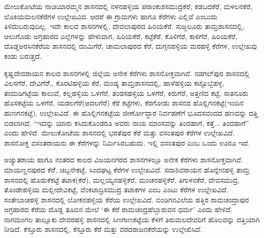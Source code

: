ಮೇಲುಕೋಟೆಯ ನಾಚಿಯಾರಮ್ಮನ ಶಾಸನದಲ್ಲಿ ನಳನಹಳ್ಳಿಯ ಪರಾಂಕುಶಸಮುದ್ರಕೆರೆ, ಕಡಬದಕೆರೆ, ಮಳಲನಕೆರೆ, ಲೊಕಿಯಮಲನಕೆರೆಗಳ ಉಲ್ಲೇಖವಿದ. ಆದರೆ ಈ ಗ್ರಾಮಗಳು ಹಾಗೂ ಕೆರೆಗಳು ಎಲ್ಲಿವೆ ಎಂಬುದು ತಿಳಿದುಬರುವುದಿಲ್ಲ. ಇದೇ ಕಾಲದ ಶಾಸನಗಳಲ್ಲಿ, ದೇವಲಾಪುರದ ಹಿರಿಯಕೆರೆ. ಸುಜ್ಜಲೂರು ತಾಮ್ರಶಾಸನದಲ್ಲಿ, ಆಲುಗೊಡು ಅಗ್ರಹಾರದ ಎಲ್ಲೆಗಳನ್ನು ಹೇಳುವಾಗ, ಹಿರಿಯಕೆರೆ, ಕಟ್ಟೆಕೆರೆ, ಕೊಳಿಗೆರೆ, ಕಾಳಿಗೆರೆ, ಹಿರಿಯಕೆರೆ, ದೊಡ್ಡಅರಸಿನಕೆರೆಯ ಶಾಸನದಲ್ಲಿ ದಂಮಿಗೆರೆ, ಚಾಮಲಾಪುರದ ಕೆರೆ, ದುಗ್ಗನಹಳ್ಳಿಯ ಮರಹಳ್ಳಿ ಕೆರೆಗಳ, ಉಲ್ಲೇಖವು ಕಂಡು ಬರುತ್ತದೆ.

ಕೃಷ್ಣದೇವರಾಯನ ಕಾಲದ ಶಾಸನಗಳಲ್ಲಿ ಜಿಲ್ಲೆಯ ಅನೇಕ ಕೆರೆಗಳು ಶಾಸನೋಕ್ತವಾಗಿವೆ. ನಡಗಲ್​ಪುರ ಶಾಸನದಲ್ಲಿ ವಿಲಸಗೆರೆ, ದೇವಿಗೆರೆೆ,, ಕೊರಟಿಹಳ್ಳಿಯ ಕೆರೆ, ಮಂಡ್ಯ ತಾಮ್ರಶಾಸನದಲ್ಲಿ, ಹಾಳೆಹಳ್ಳಿಯ ಕಟ್ಟೊಬ್ಬೆಹಳ್ಳ, ತಂಮಡಿಗಟ್ಟೆಯ ಕಾಲುವೆ, ಕಲ್ಲಹಳ್ಳಿಯ ಒಳಗೆರೆ, ತಂಡಸಹಳ್ಳಿಯ ಒಳಗೆರೆ, ಕಿರುಗೆರೆ, ಅತ್ತಣಿದ ಕಟ್ಟೆ, ಸಾತನೂರು ಹೊಸಕಟ್ಟೆಯ ಒಳಗೆರೆ, ಯಡಲಗೆರೆ(ಅದಲಗೆರೆ) ಕೆರೆ ಕಟ್ಟೆಗಳು, ಕೆರಗೋಡು ಶಾಸನದ ಹೊಲ್ಲಿಗನಕಟ್ಟೆ(ಇಂದಿನ ಹುಣಗನಕಟ್ಟೆ), ಉಲ್ಲೇಖವಿದೆ. ಈ ಹೊಲ್ಲಿಗನಕಟ್ಟೆಯ ಜೀರ್ಣೋದ್ಧಾರ ನಿರ್ವಹಣೆಗೆ ಭೂದಸವಂದದ ಹಣವನ್ನು ದತ್ತಿ ಬಿಡಲಾಗಿದೆ. “ಇದನ್ನು ಯಾರು ಕಸಿದುಕೊಂಡರೂ ಅವರು ನಾಯ ಮಾಂಸವನ್ನು ತಿಂದಹಾಗೆ, ಕತ್ತೆ... ತಿಂದಹಾಗೆ” ಎಂದು ಹೇಳಿದೆ. ಮೇಲುಕೋಟೆಯ ಶಾಸನದಲ್ಲಿ ಭರತೆಪುರ ಕೆರೆ ಮತ್ತು ವಸಂತಪುರ ಕೆರೆಗಳ ಉಲ್ಲೇಖವಿದೆ. ಶಾಸನೋಕ್ತ ವಸಂತರಾಯನು ಈ ಕೆರೆಗಳನ್ನು ನಿರ್ಮಿಸಿರಬಹುದು. ಇಲ್ಲಿ ವಸಂತಪುರ ಎಂಬ ಒಂದು ಊರೂ ಇದೆ.

ಅಚ್ಯುತರಾಯ ಹಾಗೂ ನಂತರದ ಕಾಲದ ವಿಜಯನಗರದ ಶಾಸನಗಳಲ್ಲೂ ಅನೇಕ ಕೆರೆಗಳು ಶಾಸನೋಕ್ತವಾಗಿವೆ. ಮಾಯಣ್ಣನಪುರದ ಕೆರೆೆ, ಚಿಬ್ಬನೇಕಟ್ಟೆ, ಸಿಂದಘಟ್ಟ ಕೆರೆಗಳ ಉಲ್ಲೇಖವಿದೆ. ಸದಾಶಿವರಾಯನ ಹೊನ್ನೇನಹಳ್ಳಿ ತಾಮ್ರ ಶಾಸನದಲ್ಲಿ ಹೊಡುಕೆಕಟ್ಟೆ ತಟಾಕ(ಕೆರೆ), ಮಲ್ಲಯ್ಯನಹಳ್ಳಿಕೆರೆ, ಮಂಚನಹಳ್ಳಿಕೆರೆ, ತಿಗುಳನಕೆರೆ, ದೇವಸಮುದ್ರ, ತೊಂಡೇಹಳ್ಳಿಯ ಮಲ್ಲೀದೇವಿಕಟ್ಟೆ, ವೆಂಕಟಾದ್ರಿಸಮುದ್ರ ತಟಾಕಗಳ ಎಂಬ ಎಂಟು ಕೆರೆಗಳ ಉಲ್ಲೇಖವಿದೆ. ಸಂತೇಬಾಚಹಳ್ಳಿ ಶಾಸನದಲ್ಲಿ ಲೋಕನಹಳ್ಳಿಯ ಕೆರೆಯ ಉಲ್ಲೇಖವಿದೆ. ಬಿಂಡಿಗನವಿಲೆಯ ಹತ್ತಿರ ರಾಮಚಂದ್ರಾಪುರ ಅಗ್ರಹಾರದ ಕೆರೆಯ ದೊಡ್ಡ ತೂಬಿನ ಮೇಲೆ ‘ಈ ಕೆರೆ ರಾಮಚಂದ್ರಹೆಬ್ಬಾರುವನ ಧರ್ಮ’ ಎಂದು ಹೇಳಿದೆ. ನಾಗಮಂಗಲ ತಾಲ್ಲೂಕು ದೇವರಹಳ್ಳಿ ಶಾಸನದಲ್ಲಿ ಸಿಣಗಾಣಕಟ್ಟೆಯ ಕೆಳಗೆ ತಿರುಮಲದೇವರಿಗೆ ಹೊಲವನ್ನು ದತ್ತಿಯಾಗಿ ನೀಡಿದೆ. ಕೆಸ್ತೂರು ಶಾಸನದಲ್ಲಿ, ಕೆಸ್ತೂರು ಕೆರೆ ಮತ್ತು ವರದರಾಜನಕೆರೆಯನ್ನು ಉಲ್ಲೇಖಿಸಿದೆ.


